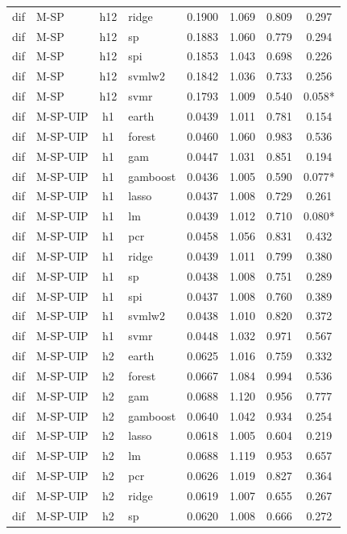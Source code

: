 \begin{ThreePartTable}
\begin{longtable}[t]{llclcccc}
dif & M-SP & h12 & ridge & 0.1900 & 1.069 & 0.809 & 0.297\\
dif & M-SP & h12 & sp & 0.1883 & 1.060 & 0.779 & 0.294\\
dif & M-SP & h12 & spi & 0.1853 & 1.043 & 0.698 & 0.226\\
dif & M-SP & h12 & svmlw2 & 0.1842 & 1.036 & 0.733 & 0.256\\
dif & M-SP & h12 & svmr & 0.1793 & 1.009 & 0.540 & 0.058*\\
\addlinespace
dif & M-SP-UIP & h1 & earth & 0.0439 & 1.011 & 0.781 & 0.154\\
dif & M-SP-UIP & h1 & forest & 0.0460 & 1.060 & 0.983 & 0.536\\
dif & M-SP-UIP & h1 & gam & 0.0447 & 1.031 & 0.851 & 0.194\\
dif & M-SP-UIP & h1 & gamboost & 0.0436 & 1.005 & 0.590 & 0.077*\\
dif & M-SP-UIP & h1 & lasso & 0.0437 & 1.008 & 0.729 & 0.261\\
dif & M-SP-UIP & h1 & lm & 0.0439 & 1.012 & 0.710 & 0.080*\\
dif & M-SP-UIP & h1 & pcr & 0.0458 & 1.056 & 0.831 & 0.432\\
dif & M-SP-UIP & h1 & ridge & 0.0439 & 1.011 & 0.799 & 0.380\\
dif & M-SP-UIP & h1 & sp & 0.0438 & 1.008 & 0.751 & 0.289\\
dif & M-SP-UIP & h1 & spi & 0.0437 & 1.008 & 0.760 & 0.389\\
dif & M-SP-UIP & h1 & svmlw2 & 0.0438 & 1.010 & 0.820 & 0.372\\
dif & M-SP-UIP & h1 & svmr & 0.0448 & 1.032 & 0.971 & 0.567\\
\addlinespace
dif & M-SP-UIP & h2 & earth & 0.0625 & 1.016 & 0.759 & 0.332\\
dif & M-SP-UIP & h2 & forest & 0.0667 & 1.084 & 0.994 & 0.536\\
dif & M-SP-UIP & h2 & gam & 0.0688 & 1.120 & 0.956 & 0.777\\
dif & M-SP-UIP & h2 & gamboost & 0.0640 & 1.042 & 0.934 & 0.254\\
dif & M-SP-UIP & h2 & lasso & 0.0618 & 1.005 & 0.604 & 0.219\\
dif & M-SP-UIP & h2 & lm & 0.0688 & 1.119 & 0.953 & 0.657\\
dif & M-SP-UIP & h2 & pcr & 0.0626 & 1.019 & 0.827 & 0.364\\
dif & M-SP-UIP & h2 & ridge & 0.0619 & 1.007 & 0.655 & 0.267\\
dif & M-SP-UIP & h2 & sp & 0.0620 & 1.008 & 0.666 & 0.272\\

\end{longtable}
\end{ThreePartTable}
